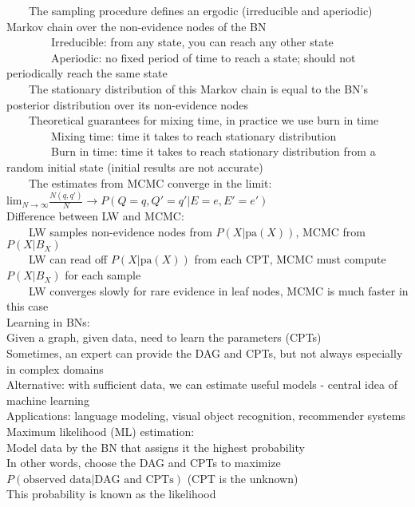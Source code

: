 \documentclass[10pt,letterpaper,unboxed,cm]{article}
\newcommand{\tab}{~~~~}
\begin{document}
\tab The sampling procedure defines an ergodic (irreducible and aperiodic) Markov chain over the non-evidence nodes of the BN\\
\tab \tab Irreducible: from any state, you can reach any other state\\
\tab \tab Aperiodic: no fixed period of time to reach a state; should not periodically reach the same state\\
\tab The stationary distribution of this Markov chain is equal to the BN's posterior distribution over its non-evidence nodes\\
\tab Theoretical guarantees for mixing time, in practice we use burn in time\\
\tab \tab Mixing time: time it takes to reach stationary distribution\\
\tab \tab Burn in time: time it takes to reach stationary distribution from a random initial state (initial results are not accurate)\\
\tab The estimates from MCMC converge in the limit: $\text{lim}_{N \to \infty} \frac{N(q,q')}{N} \to P(Q = q, Q' = q'|E = e, E' = e')$\\
Difference between LW and MCMC: \\
\tab LW samples non-evidence nodes from $P(X|\text{pa}(X))$, MCMC from $P(X|B_X)$\\
\tab LW can read off $P(X|\text{pa}(X))$ from each CPT, MCMC must compute $P(X|B_X)$ for each sample\\
\tab LW converges slowly for rare evidence in leaf nodes, MCMC is much faster in this case\\
Learning in BNs: \\
Given a graph, given data, need to learn the parameters (CPTs)\\
Sometimes, an expert can provide the DAG and CPTs, but not always especially in complex domains\\
Alternative: with sufficient data, we can estimate useful models - central idea of machine learning\\
Applications: language modeling, visual object recognition, recommender systems\\
Maximum likelihood (ML) estimation: \\
Model data by the BN that assigns it the highest probability\\
In other words, choose the DAG and CPTs to maximize $P(\text{observed data} | \text{DAG and CPTs})$ (CPT is the unknown)\\
This probability is known as the likelihood\\
\end{document}

